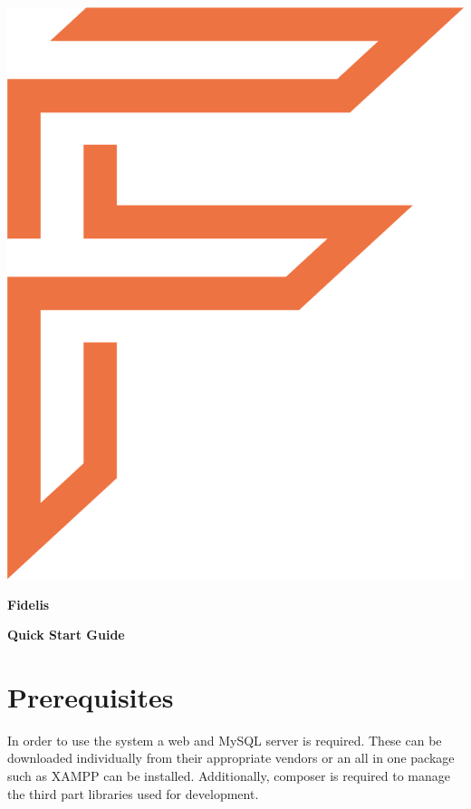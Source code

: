 \documentclass[12pt]{article}
\begin{document}
\begin{spacing}{2}
	\vspace*{\fill}
	\begin{center}
		\includegraphics[scale = 0.2]{Images/Logo}
	\end{center}
	\vspace{5mm}
	
	\begin{center}
		\textbf{\large Fidelis}
	\end{center}
	
	\begin{center}
		\textbf{\large Quick Start Guide}
	\end{center}
	\vspace*{\fill}
\end{spacing}

\newpage
\tableofcontents

\newpage
{}

\section{Prerequisites}
In order to use the system a web and MySQL server is required. These can be downloaded individually from their appropriate vendors or an all in one package such as XAMPP can be installed. Additionally, composer is required to manage the third part libraries used for development.
\end{document}
